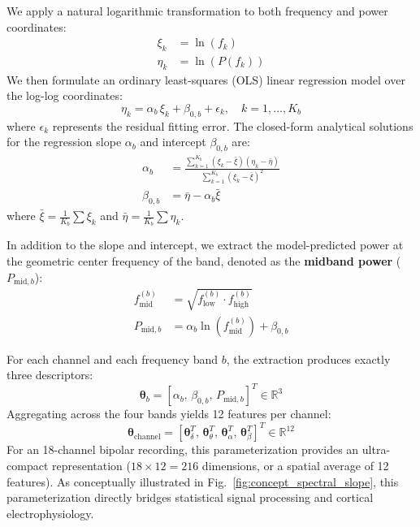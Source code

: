 \documentclass[10pt,twocolumn,letterpaper]{article}
\begin{document}
We apply a natural logarithmic transformation to both frequency and power coordinates:
\begin{align}
    \xi_k &= \ln(f_k) \\
    \eta_k &= \ln(P(f_k))
\end{align}
We then formulate an ordinary least-squares (OLS) linear regression model over the log-log coordinates:
\begin{equation}
    \eta_k = \alpha_b \, \xi_k + \beta_{0,b} + \epsilon_k, \quad k = 1, \dots, K_b
\end{equation}
where $\epsilon_k$ represents the residual fitting error. The closed-form analytical solutions for the regression slope $\alpha_b$ and intercept $\beta_{0,b}$ are:
\begin{align}
    \alpha_b &= \frac{\sum_{k=1}^{K_b} (\xi_k - \bar{\xi})(\eta_k - \bar{\eta})}{\sum_{k=1}^{K_b} (\xi_k - \bar{\xi})^2} \label{eq:slope} \\
    \beta_{0,b} &= \bar{\eta} - \alpha_b \bar{\xi} \label{eq:intercept}
\end{align}
where $\bar{\xi} = \frac{1}{K_b} \sum \xi_k$ and $\bar{\eta} = \frac{1}{K_b} \sum \eta_k$.

In addition to the slope and intercept, we extract the model-predicted power at the geometric center frequency of the band, denoted as the \textbf{midband power} ($P_{\text{mid}, b}$):
\begin{align}
    f_{\text{mid}}^{(b)} &= \sqrt{f_{\text{low}}^{(b)} \cdot f_{\text{high}}^{(b)}} \\
    P_{\text{mid}, b} &= \alpha_b \ln(f_{\text{mid}}^{(b)}) + \beta_{0,b} \label{eq:midband}
\end{align}

For each channel and each frequency band $b$, the extraction produces exactly three descriptors:
\begin{equation}
    \bm{\theta}_b = \left[ \alpha_b, \, \beta_{0,b}, \, P_{\text{mid}, b} \right]^T \in \mathbb{R}^3
\end{equation}
Aggregating across the four bands yields 12 features per channel:
\begin{equation}
    \bm{\theta}_{\text{channel}} = \left[ \bm{\theta}_\delta^T, \, \bm{\theta}_\theta^T, \, \bm{\theta}_\alpha^T, \, \bm{\theta}_\beta^T \right]^T \in \mathbb{R}^{12}
\end{equation}
For an 18-channel bipolar recording, this parameterization provides an ultra-compact representation ($18 \times 12 = 216$ dimensions, or a spatial average of 12 features). As conceptually illustrated in Fig.~\ref{fig:concept_spectral_slope}, this parameterization directly bridges statistical signal processing and cortical electrophysiology.
\end{document}
